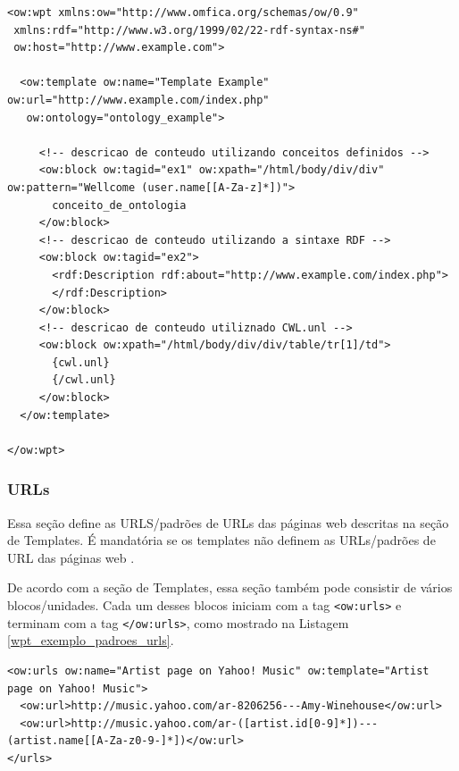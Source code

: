 \pagebreak
{}
\begin{lstlisting}[label=wpt_descricao_conteudo]
<ow:wpt xmlns:ow="http://www.omfica.org/schemas/ow/0.9"
 xmlns:rdf="http://www.w3.org/1999/02/22-rdf-syntax-ns#"
 ow:host="http://www.example.com">

  <ow:template ow:name="Template Example" ow:url="http://www.example.com/index.php"
   ow:ontology="ontology_example">

     <!-- descricao de conteudo utilizando conceitos definidos -->
     <ow:block ow:tagid="ex1" ow:xpath="/html/body/div/div" ow:pattern="Wellcome (user.name[[A-Za-z]*])">
       conceito_de_ontologia
     </ow:block>
     <!-- descricao de conteudo utilizando a sintaxe RDF -->
     <ow:block ow:tagid="ex2">
       <rdf:Description rdf:about="http://www.example.com/index.php">
       </rdf:Description>
     </ow:block>
     <!-- descricao de conteudo utiliznado CWL.unl -->
     <ow:block ow:xpath="/html/body/div/div/table/tr[1]/td">
       {cwl.unl}
       {/cwl.unl}
     </ow:block>
  </ow:template>

</ow:wpt>
\end{lstlisting}

\subsubsection{URLs}

Essa seção define as URLS/padrões de URLs das páginas web descritas na seção de Templates. É mandatória se os templates não definem as URLs/padrões de URL das páginas web \cite{wpt}.

De acordo com a seção de Templates, essa seção também pode consistir de vários blocos/unidades. Cada um desses blocos iniciam com a tag \texttt{<ow:urls>} e terminam com a tag \texttt{</ow:urls>}, como mostrado na Listagem \ref{wpt_exemplo_padroes_urls}.


\begin{lstlisting}[label=wpt_exemplo_padroes_urls]
<ow:urls ow:name="Artist page on Yahoo! Music" ow:template="Artist page on Yahoo! Music">
  <ow:url>http://music.yahoo.com/ar-8206256---Amy-Winehouse</ow:url>
  <ow:url>http://music.yahoo.com/ar-([artist.id[0-9]*])---(artist.name[[A-Za-z0-9-]*])</ow:url>
</urls>
\end{lstlisting}

